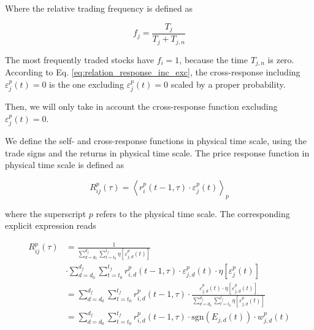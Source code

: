 Where the relative trading frequency is defined as \cite{Wang_2016_avg}

\begin{equation}\label{eq:response_trading_frequency}
    f_{j}=\frac{T_{j}}{T_{j}+T_{j,n}}
\end{equation}

The most frequently traded stocks have $f_{i} = 1$, because the time $T_{j,n}$
is zero. According to Eq. \ref{eq:relation_response_inc_exc}, the
cross-response including $\varepsilon^{p}_j \left( t\right) = 0$ is the one
excluding $\varepsilon^{p}_j \left( t\right) = 0$ scaled by a proper
probability.

Then, we will only take in account the cross-response function excluding
$\varepsilon^{p}_j \left( t\right) = 0$.

We define the self- and cross-response functions in physical time scale, using
the trade signs and the returns in physical time scale. The price response
function in physical time scale is defined as

\begin{equation}\label{eq:response_functions_time_scale_general}
    R^{p}_{ij}\left(\tau\right)=\left\langle r^{p}_{i}\left(t-1, \tau\right)
    \cdot\varepsilon_{j}^{p} \left(t\right)
    \right\rangle _{p}
\end{equation}

where the superscript $p$ refers to the physical time scale. The corresponding
explicit expression reads

\begin{align}\label{eq:response_seconds_explicit}
    R_{ij}^{p}\left(\tau\right)&=\frac{1}{\sum_{d=d_{0}}^{d_{f}}
    \sum_{t=t_{0}}^{t_{f}} \eta\left[ \varepsilon_{j,d}^{p}
    \left(t\right)\right]} \nonumber \\
    &\cdot\sum_{d=d_{0}}^{d_{f}} \sum_{t=t_{0}}^{t_{f}}
    r^{p}_{i,d}\left(t-1,\tau\right) \cdot\varepsilon_{j,d}^{p}\left(t\right)
    \cdot\eta\left[\varepsilon_{j}^{p} \left(t\right)\right] \\
    &=\sum_{d=d_{0}}^{d_{f}}\sum_{t=t_{0}}^{t_{f}}r^{p}_{i,d}
    \left(t-1,\tau\right) \cdot\frac{\varepsilon_{j,d}^{p}\left(t\right)
    \cdot\eta\left[\varepsilon_{j,d}^{p} \left( t\right)\right]}
    {\sum_{d=d_{0}}^{d_{f}}\sum_{t=t_{0}}^{t_{f}}\eta
    \left[\varepsilon_{j,d}^{p} \left(t\right)\right]} \nonumber \\
    &=\sum_{d=d_{0}}^{d_{f}}\sum_{t=t_{0}}^{t_{f}}r^{p}_{i,d}
    \left(t-1,\tau\right) \cdot\text{sgn}\left(E_{j,d}\left(t\right)\right)
    \cdot w_{j,d}^{p}\left(t\right)
\end{align}


